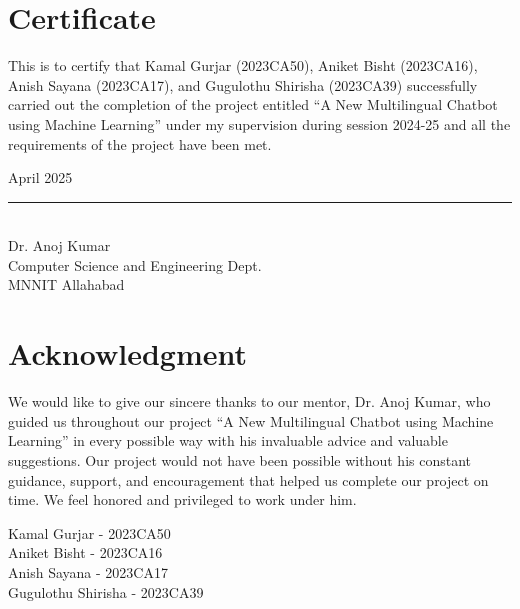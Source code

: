 \documentclass[12pt]{report}
\begin{document}
\chapter*{Certificate}
This is to certify that Kamal Gurjar (2023CA50), Aniket Bisht (2023CA16), Anish Sayana (2023CA17), and Gugulothu Shirisha (2023CA39) successfully carried out the completion of the project entitled ``A New Multilingual Chatbot using Machine Learning'' under my supervision during session 2024-25 and all the requirements of the project have been met.

\vspace{2cm}
April 2025

\vspace{2cm}
\noindent\rule{10cm}{0.4pt}\\
Dr. Anoj Kumar\\
Computer Science and Engineering Dept.\\
MNNIT Allahabad

\chapter*{Acknowledgment}
We would like to give our sincere thanks to our mentor, Dr. Anoj Kumar, who guided us throughout our project ``A New Multilingual Chatbot using Machine Learning'' in every possible way with his invaluable advice and valuable suggestions. Our project would not have been possible without his constant guidance, support, and encouragement that helped us complete our project on time. We feel honored and privileged to work under him.

\vspace{2cm}
Kamal Gurjar - 2023CA50\\
Aniket Bisht - 2023CA16\\
Anish Sayana - 2023CA17\\
Gugulothu Shirisha - 2023CA39
\end{document}

